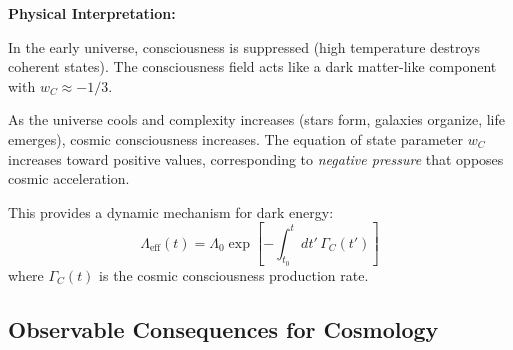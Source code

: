 \begin{level1}
\textbf{Physical Interpretation:}

In the early universe, consciousness is suppressed (high temperature destroys coherent states). The consciousness field acts like a dark matter-like component with $w_C \approx -1/3$.

As the universe cools and complexity increases (stars form, galaxies organize, life emerges), cosmic consciousness increases. The equation of state parameter $w_C$ increases toward positive values, corresponding to \textit{negative pressure} that opposes cosmic acceleration.

This provides a dynamic mechanism for dark energy:
\begin{equation}
\Lambda_{\text{eff}}(t) = \Lambda_0 \exp\left[ -\int_{t_0}^t dt' \, \Gamma_C(t') \right]
\end{equation}
where $\Gamma_C(t)$ is the cosmic consciousness production rate.
\end{level1}

\subsection{Observable Consequences for Cosmology}

